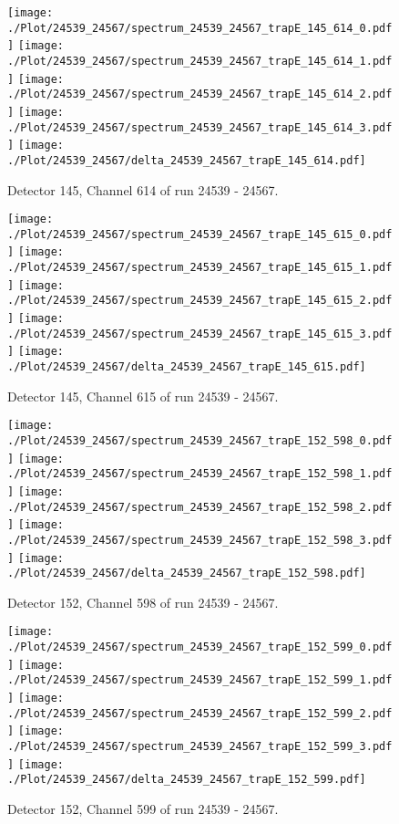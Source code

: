 \clearpage
\begin{figure}[hb]
\centering
\texttt{[image: ./Plot/24539\_24567/spectrum\_24539\_24567\_trapE\_145\_614\_0.pdf]}
\texttt{[image: ./Plot/24539\_24567/spectrum\_24539\_24567\_trapE\_145\_614\_1.pdf]}
\texttt{[image: ./Plot/24539\_24567/spectrum\_24539\_24567\_trapE\_145\_614\_2.pdf]}
\texttt{[image: ./Plot/24539\_24567/spectrum\_24539\_24567\_trapE\_145\_614\_3.pdf]}
\texttt{[image: ./Plot/24539\_24567/delta\_24539\_24567\_trapE\_145\_614.pdf]}
\caption{ Detector 145, Channel 614 of run 24539 - 24567.}
\label{fig:24539_24567_trapE_145_614}
\end{figure}
\clearpage
\begin{figure}[hb]
\centering
\texttt{[image: ./Plot/24539\_24567/spectrum\_24539\_24567\_trapE\_145\_615\_0.pdf]}
\texttt{[image: ./Plot/24539\_24567/spectrum\_24539\_24567\_trapE\_145\_615\_1.pdf]}
\texttt{[image: ./Plot/24539\_24567/spectrum\_24539\_24567\_trapE\_145\_615\_2.pdf]}
\texttt{[image: ./Plot/24539\_24567/spectrum\_24539\_24567\_trapE\_145\_615\_3.pdf]}
\texttt{[image: ./Plot/24539\_24567/delta\_24539\_24567\_trapE\_145\_615.pdf]}
\caption{ Detector 145, Channel 615 of run 24539 - 24567.}
\label{fig:24539_24567_trapE_145_615}
\end{figure}
\clearpage
\begin{figure}[hb]
\centering
\texttt{[image: ./Plot/24539\_24567/spectrum\_24539\_24567\_trapE\_152\_598\_0.pdf]}
\texttt{[image: ./Plot/24539\_24567/spectrum\_24539\_24567\_trapE\_152\_598\_1.pdf]}
\texttt{[image: ./Plot/24539\_24567/spectrum\_24539\_24567\_trapE\_152\_598\_2.pdf]}
\texttt{[image: ./Plot/24539\_24567/spectrum\_24539\_24567\_trapE\_152\_598\_3.pdf]}
\texttt{[image: ./Plot/24539\_24567/delta\_24539\_24567\_trapE\_152\_598.pdf]}
\caption{ Detector 152, Channel 598 of run 24539 - 24567.}
\label{fig:24539_24567_trapE_152_598}
\end{figure}
\clearpage
\begin{figure}[hb]
\centering
\texttt{[image: ./Plot/24539\_24567/spectrum\_24539\_24567\_trapE\_152\_599\_0.pdf]}
\texttt{[image: ./Plot/24539\_24567/spectrum\_24539\_24567\_trapE\_152\_599\_1.pdf]}
\texttt{[image: ./Plot/24539\_24567/spectrum\_24539\_24567\_trapE\_152\_599\_2.pdf]}
\texttt{[image: ./Plot/24539\_24567/spectrum\_24539\_24567\_trapE\_152\_599\_3.pdf]}
\texttt{[image: ./Plot/24539\_24567/delta\_24539\_24567\_trapE\_152\_599.pdf]}
\caption{ Detector 152, Channel 599 of run 24539 - 24567.}
\label{fig:24539_24567_trapE_152_599}
\end{figure}

